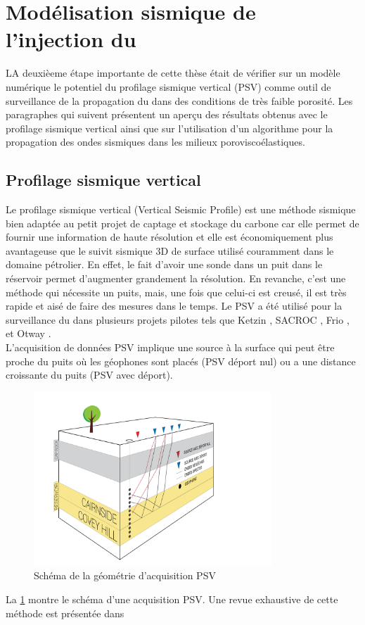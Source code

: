 \section{Modélisation sismique de l'injection du \texorpdfstring{}{CO2}}
\label{sc:model}
LA deuxièeme étape importante de cette thèse était de vérifier sur un modèle numérique le potentiel du profilage sismique vertical (PSV) comme outil de surveillance de la propagation du  dans des conditions de très faible porosité. Les paragraphes qui suivent présentent un aperçu des résultats obtenus avec le profilage sismique vertical ainsi que sur l'utilisation d'un algorithme pour la propagation des ondes sismiques dans les milieux poroviscoélastiques.
\subsection{Profilage sismique vertical}
Le profilage sismique vertical (Vertical Seismic Profile) est une méthode sismique bien adaptée au petit projet de captage et stockage du carbone car elle permet de fournir une information de haute résolution \citep{Yang2014} et elle est économiquement plus avantageuse que le suivit sismique 3D de surface utilisé couramment dans le domaine pétrolier. En effet, le fait d'avoir une sonde dans un puit dans le réservoir permet d'augmenter grandement la résolution. En revanche, c'est une méthode qui nécessite un puits, mais, une fois que celui-ci est creusé, il est très rapide et aisé de faire des mesures dans le temps. Le PSV a été utilisé pour la surveillance du   dans plusieurs projets pilotes tels que Ketzin \citep{Yang2010}, SACROC \citep{Yang2014,Cheng2010}, Frio \citep{Daley2008}, et Otway \citep{Urosevic2008}.\\
L'acquisition de données PSV implique une source à la surface qui peut être proche du puits où les géophones sont placés (PSV déport nul) ou a une distance croissante du puits (PSV avec déport). 
\begin{figure}[ht]
\centering
\includegraphics[width=0.8\textwidth]{fig/vsp_3D.pdf}
\caption{Schéma de la géométrie d'acquisition PSV}
\label{fig:vsp_3D}
\end{figure}
La \cref{fig:vsp_3D} montre le schéma d'une acquisition PSV. Une revue exhaustive de cette méthode est présentée dans \citep{Hardage1992,Mari2003}
